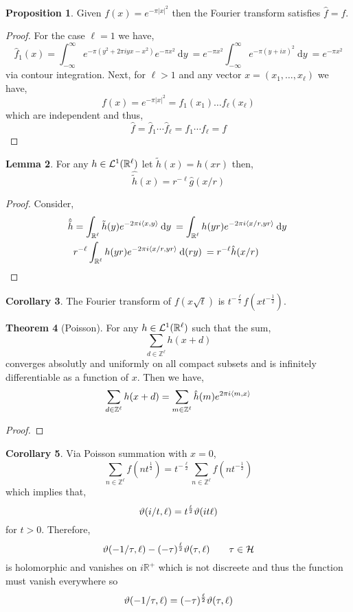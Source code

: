 \documentclass{article}
\newcommand{\Z}{\mathbb{Z}}
\newcommand{\R}{\mathbb{R}}
\renewcommand{\d}[1]{\: \mathrm{d}#1 \:}
\theoremstyle{definition}
\newtheorem{theorem}{Theorem}[section]
\newtheorem{lemma}[theorem]{Lemma}
\newtheorem{proposition}[theorem]{Proposition}
\newtheorem{corollary}[theorem]{Corollary}
\newcommand{\half}{\mathcal{H}}
\begin{document}
\begin{proposition}
Given $f(x) = e^{- \pi |x|^2}$ then the Fourier transform satisfies $\hat{f} = f$.
\end{proposition}

\begin{proof}
For the case $\ell = 1$ we have,
\[ \hat{f}_1(x) = \int_{-\infty}^{\infty} e^{-\pi (y^2 + 2 \pi i y x - x^2)} e^{-\pi x^2} \d{y} = e^{-\pi x^2} \int_{-\infty}^{\infty} e^{- \pi (y + i x)^2} \d{y} = e^{- \pi x^2} \]
via contour integration. Next, for $\ell > 1$ and any vector $x = (x_1, \dots, x_\ell)$ we have,
\[ f(x) = e^{-\pi |x|^2} = f_1(x_1) \dots f_\ell(x_\ell) \]
which are independent and thus,
\[ \hat{f} = \hat{f}_1 \cdots \hat{f}_\ell = f_1 \cdots f_\ell = f \]
\end{proof}

\begin{lemma}
For any $h \in \L^1(\R^\ell)$ let $\tilde{h}(x) = h(xr)$ then,
\[ \hat{\tilde{h}}(x) = r^{-\ell} \hat{g}(x/r) \]
\end{lemma}

\begin{proof}
Consider,
\begin{align*}
\hat{\tilde{h}} & = \int_{\R^{\ell}} \tilde{h}(y) e^{- 2\pi i \inner{x}{y}} \d{y} = \int_{\R^{\ell}} h(yr) e^{- 2\pi i \inner{x/r}{yr}} \d{y} 
\\
& r^{-\ell} \int_{\R^{\ell}} h(yr) e^{- 2\pi i \inner{x/r}{yr}} \d{(r y)} = r^{-\ell} \hat{h}(x/r) 
\end{align*}
\end{proof}

\begin{corollary}
The Fourier transform of $f(x \sqrt{t})$ is $t^{-\frac{\ell}{2}} f(x t^{-\frac{1}{2}})$.
\end{corollary}

\begin{theorem}[Poisson]
For any $h \in \L^1(\R^\ell)$ such that the sum,
\[ \sum_{d \in \Z^\ell} h(x + d) \] 
converges absolutly and uniformly on all compact subsets and is infinitely differentiable as a function of $x$. Then we have,
\[ \sum_{d \in \Z^\ell} h(x + d) = \sum_{m \in \Z^{\ell}} \hat{h}(m) e^{2 \pi i \inner{m}{x}} \]
\end{theorem}

\begin{proof}

\end{proof}

\begin{corollary}
Via Poisson summation with $x = 0$,
\[ \sum_{n \in \Z^\ell} f(n t^{\frac{1}{2}}) = t^{-\frac{\ell}{2}} \sum_{n \in \Z^\ell} f(n t^{-\frac{1}{2}}) \] 
which implies that,
\[ \vartheta(i/t, \ell) = t^{\frac{\ell}{2}} \vartheta(it \ell) \]
for $t > 0$. Therefore,
\[ \vt(-1/\tau, \ell) - (- \tau)^{\frac{\ell}{2}} \vt(\tau, \ell) \quad \quad \tau \in \half \]
is holomorphic and vanishes on $i \R^+$ which is not discreete and thus the function must vanish everywhere so 
\[ \vartheta(-1/\tau, \ell) = (- \tau)^{\frac{\ell}{2}} \vartheta(\tau, \ell) \]
\end{corollary}
\end{document}
